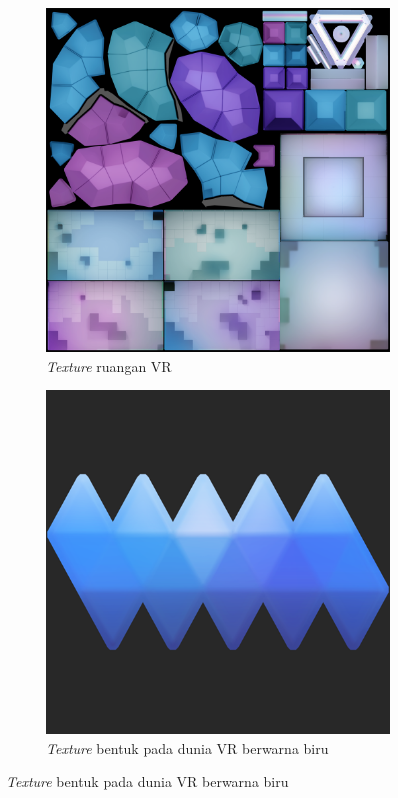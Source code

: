 \begin{figure}[]
	\begin{subfigure}{.33\textwidth}
  		\centering
  		\includegraphics[width=.8\linewidth]{Gambar/room.png}
  		\caption{\textit{Texture} ruangan VR \\}
  		\label{fig:vr-room}
	\end{subfigure}
	\begin{subfigure}{.33\textwidth}
  		\centering
  		\includegraphics[width=.8\linewidth]{Gambar/shape_blue.png}
  		\caption{\textit{Texture} bentuk pada dunia VR berwarna biru \\}

\end{subfigure}
\end{figure}
